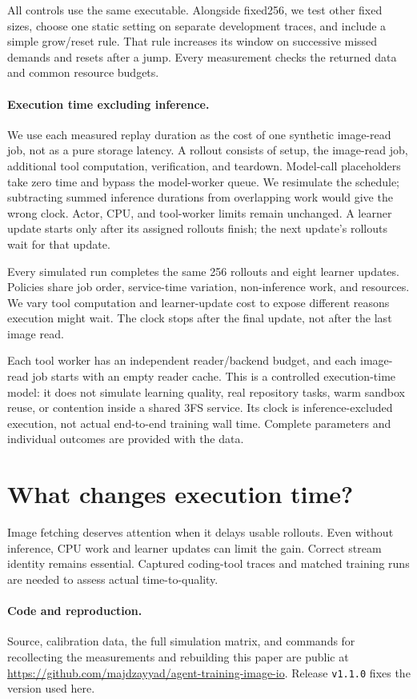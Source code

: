 \documentclass[10pt,twocolumn]{article}
\begin{document}
All controls use the same executable. Alongside fixed256, we test other
fixed sizes, choose one static setting on separate development traces,
and include a simple grow/reset rule. That rule increases its window on
successive missed demands and resets after a jump. Every measurement
checks the returned data and common resource budgets.

\paragraph{Execution time excluding inference.}
We use each measured replay duration as the cost of one synthetic
image-read job, not as a pure storage latency. A rollout consists of
setup, the image-read job, additional tool computation, verification,
and teardown. Model-call placeholders take zero time and bypass the
model-worker queue. We resimulate the schedule; subtracting summed
inference durations from overlapping work would give the wrong clock.
Actor, CPU, and tool-worker limits remain unchanged.
A learner update starts only after its assigned rollouts finish; the
next update's rollouts wait for that update.

Every simulated run completes the same 256 rollouts and eight learner
updates. Policies share job order, service-time variation, non-inference
work, and resources. We vary tool computation and learner-update cost
to expose different reasons execution might wait.
The clock stops after the final update, not after the last image read.

Each tool worker has an independent reader/backend budget, and each
image-read job starts with an empty reader cache. This is a controlled
execution-time model: it does not simulate learning quality, real
repository tasks, warm sandbox reuse, or contention inside a shared
3FS service. Its clock is inference-excluded execution, not actual
end-to-end training wall time. Complete parameters and individual
outcomes are provided with the data.

\section{What changes execution time?}


Image fetching deserves attention when it delays usable rollouts.
Even without inference, CPU work and learner updates can limit the gain.
Correct stream identity remains essential. Captured coding-tool traces
and matched training runs are needed to assess actual time-to-quality.

\paragraph{Code and reproduction.}
Source, calibration data, the full simulation matrix, and commands for
recollecting the measurements and rebuilding this paper are public at
\url{https://github.com/majdzayyad/agent-training-image-io}.
Release \texttt{v1.1.0} fixes the version used here.



\end{document}
